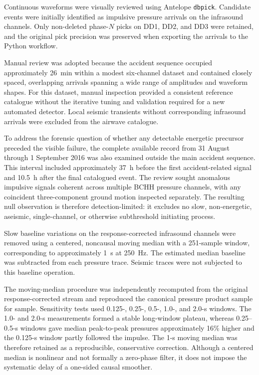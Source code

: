 \documentclass[]{seismica}
\begin{document}
Continuous waveforms were visually reviewed using Antelope \texttt{dbpick}. Candidate events were initially identified as impulsive pressure arrivals on the infrasound channels. Only non-deleted phase-$N$ picks on DD1, DD2, and DD3 were retained, and the original pick precision was preserved when exporting the arrivals to the Python workflow.

Manual review was adopted because the accident sequence occupied approximately 26~min within a modest six-channel dataset and contained closely spaced, overlapping arrivals spanning a wide range of amplitudes and waveform shapes. For this dataset, manual inspection provided a consistent reference catalogue without the iterative tuning and validation required for a new automated detector. Local seismic transients without corresponding infrasound arrivals were excluded from the airwave catalogue.

To address the forensic question of whether any detectable energetic precursor
preceded the visible failure, the complete available record from 31 August
through 1 September 2016 was also examined outside the main accident sequence.
This interval included approximately 37~h before the first accident-related
signal and 10.5~h after the final catalogued event. The review sought anomalous
impulsive signals coherent across multiple BCHH pressure channels, with any
coincident three-component ground motion inspected separately. The resulting
null observation is therefore detection-limited: it excludes no slow,
non-energetic, aseismic, single-channel, or otherwise subthreshold initiating
process.

Slow baseline variations on the response-corrected infrasound channels were removed using a centered, noncausal moving median with a 251-sample window, corresponding to approximately 1~s at 250~Hz. The estimated median baseline was subtracted from each pressure trace. Seismic traces were not subjected to this baseline operation.

The moving-median procedure was independently recomputed from the original
response-corrected stream and reproduced the canonical pressure product sample
for sample. Sensitivity tests used 0.125-, 0.25-, 0.5-, 1.0-, and 2.0-s
windows. The 1.0- and 2.0-s measurements formed a stable long-window plateau,
whereas 0.25--0.5-s windows gave median peak-to-peak pressures approximately
16\% higher and the 0.125-s window partly followed the impulse. The 1-s moving
median was therefore retained as a reproducible, conservative correction.
Although a centered median is nonlinear and not formally a zero-phase filter,
it does not impose the systematic delay of a one-sided causal smoother.
\end{document}
